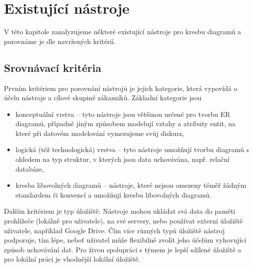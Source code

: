 \chapter{Existující nástroje}

V této kapitole zanalyzujeme některé existující nástroje pro kresbu diagramů a
porovnáme je dle navržených kritérií.

\section{Srovnávací kritéria}

Prvním kritériem pro porovnání nástrojů je jejich kategorie, která vypovídá o
účelu nástroje a cílové skupině zákazníků. Základní kategorie jsou
\begin{itemize}
  \item konceptuální vrstva -- tyto nástroje jsou většinou určené pro tvorbu ER
  diagramů, případně jiným způsobem modelují vztahy a atributy entit, na které
  při datovém modelování vymezujeme svůj diskurz,
  \item logická (též technologická) vrstva -- tyto nástroje umožňují tvorbu
  diagramů s ohledem na typ struktur, v kterých jsou data uchovávána, např.
  relační databáze,
  \item kresba libovolných diagramů -- nástroje, které nejsou omezeny téměř
  žádným standardem či konvencí a umožňují kresbu libovolných diagramů.
\end{itemize}

Dalším kritériem je typ úložiště. Nástroje mohou ukládat svá data do paměti
prohlížeče (lokálně pro uživatele), na své servery, nebo používat externí
úložiště uživatele, například Google Drive. Čím více různých typů úložiště
nástroj podporuje, tím lépe, neboť uživatel může flexibilně zvolit jeho účelům
vyhovující způsob uchovávání dat. Pro živou spolupráci s týmem je lepší sdílené
úložiště a pro lokální práci je vhodnější lokální úložiště.

